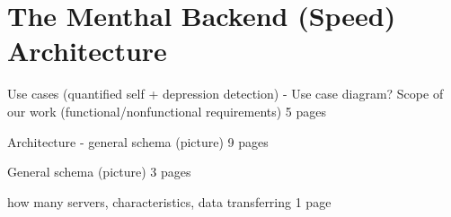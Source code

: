 \chapter{The Menthal Backend (Speed) Architecture}
\label{chap:menthal_backend_architecture}

Use cases (quantified self + depression detection) - Use case diagram?
Scope of our work (functional/nonfunctional requirements)
5 pages

Architecture - general schema (picture)
9 pages

General schema (picture)
3 pages


how many servers, characteristics, data transferring
1 page